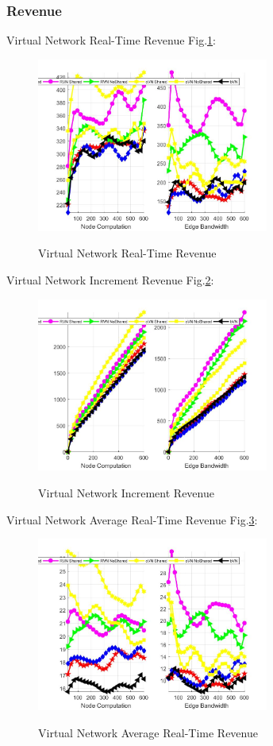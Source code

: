 \subsubsection{Revenue}
Virtual Network Real-Time Revenue Fig.\ref{fig:RevenueCurrentVirtualNetwork}:
\begin{figure}
  \centering
  \includegraphics[width=3in]{Fig/RevenueCurrentVirtualNetwork}\\
  \caption{Virtual Network Real-Time Revenue }\label{fig:RevenueCurrentVirtualNetwork}
\end{figure}

Virtual Network Increment Revenue Fig.\ref{fig:RevenueAccumulateVirtualNetwork}:
\begin{figure}
  \centering
  \includegraphics[width=3in]{Fig/RevenueAccumulateVirtualNetwork}\\
  \caption{Virtual Network Increment Revenue }\label{fig:RevenueAccumulateVirtualNetwork}
\end{figure}

Virtual Network Average Real-Time Revenue Fig.\ref{fig:RevenueAverageCurrentVirtualNetwork}:
\begin{figure}
  \centering
  \includegraphics[width=3in]{Fig/RevenueAverageCurrentVirtualNetwork}\\
  \caption{Virtual Network Average Real-Time Revenue}\label{fig:RevenueAverageCurrentVirtualNetwork}
\end{figure}


